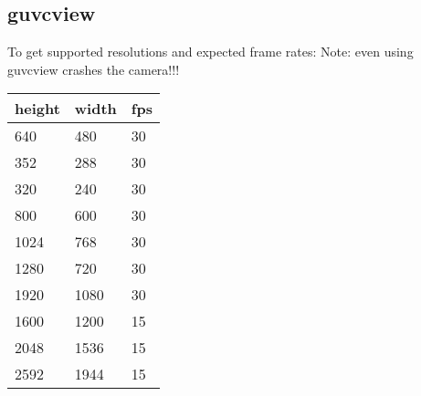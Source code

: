 \documentclass{article}
\begin{document}
\subsection{guvcview}
To get supported resolutions and expected frame rates: 
Note: even using guvcview crashes the camera!!! \\
\begin{tabular}[h]{l l l}
height & width & fps \\
\hline
 640 & 480 & 30 \\
352 & 288 & 30 \\
320 & 240 & 30 \\
800 & 600 & 30  \\
1024 & 768 & 30  \\
1280 & 720 & 30 \\
1920 & 1080& 30 \\
1600 & 1200 & 15 \\
2048 & 1536 & 15 \\
2592 & 1944 & 15 \\
\end{tabular}
\end{document}
